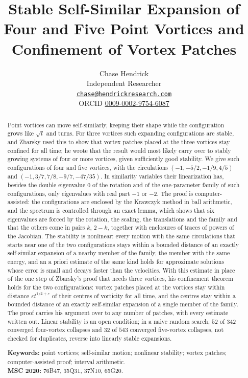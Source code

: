 \documentclass[11pt]{article}
\title{Stable Self-Similar Expansion of Four and Five Point Vortices and Confinement of Vortex Patches}
\author{Chase Hendrick\\[0.2em] {\small Independent Researcher}\\ {\small\href{mailto:chase@hendrickresearch.com}{\texttt{chase@hendrickresearch.com}}}\\ {\small ORCID \href{https://orcid.org/0009-0002-9754-6087}{0009-0002-9754-6087}}}
\date{}
\theoremstyle{definition}
\begin{document}
\maketitle

\begin{abstract}
Point vortices can move self-similarly, keeping their shape while the configuration grows like $\sqrt{t}$ and turns. For three vortices such expanding configurations are stable, and Zbarsky used this to show that vortex patches placed at the three vortices stay confined for all time; he wrote that the result would most likely carry over to stably growing systems of four or more vortices, given sufficiently good stability. We give such configurations of four and five vortices, with the circulations $(-1, -5/2, -1/9, 4/5)$ and $(-1, 3/7, 7/8, -9/7, -47/35)$. In similarity variables their linearization has, besides the double eigenvalue $0$ of the rotation and of the one-parameter family of such configurations, only eigenvalues with real part $-1$ or $-2$. The proof is computer-assisted: the configurations are enclosed by the Krawczyk method in ball arithmetic, and the spectrum is controlled through an exact lemma, which shows that six eigenvalues are forced by the rotation, the scaling, the translations and the family and that the others come in pairs $k$, $2 - k$, together with enclosures of traces of powers of the Jacobian. The stability is nonlinear: every motion with the same circulations that starts near one of the two configurations stays within a bounded distance of an exactly self-similar expansion of a nearby member of the family, the member with the same energy, and an a priori estimate of the same kind holds for approximate solutions whose error is small and decays faster than the velocities. With this estimate in place of the one step of Zbarsky's proof that needs three vortices, his confinement theorem holds for the two configurations: vortex patches placed at the vortices stay within distance $\varepsilon t^{1/4 + \varepsilon}$ of their centres of vorticity for all time, and the centres stay within a bounded distance of an exactly self-similar expansion of a single member of the family. The proof carries his argument over to any number of patches, with every estimate written out. Linear stability is an open condition; in a naive random search, $52$ of $342$ converged four-vortex collapses and $32$ of $543$ converged five-vortex collapses, not checked for duplicates, reverse into linearly stable expansions.

\medskip
\noindent\textbf{Keywords:} point vortices; self-similar motion; nonlinear stability; vortex patches; computer-assisted proof; interval arithmetic.\\
\textbf{MSC 2020:} 76B47, 35Q31, 37N10, 65G20.
\end{abstract}
\end{document}
